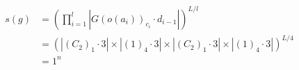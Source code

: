 \documentclass[preview]{standalone}
\begin{document}
\begin{align*}
s(g) &= \left(\prod_{i=1}^{l}\left|G(o(a_i))_{c_i}\cdot d_{i-1}\right|\right)^{L/l} \\   &= \left(\left|(C_2)_1\cdot 3\right| \times \left|(1)_4\cdot 3\right|\times \left|(C_2)_1\cdot 3\right| \times \left|(1)_4\cdot 3\right|\right)^{L/4} \\   &= 1^{n}
\end{align*}
\end{document}
